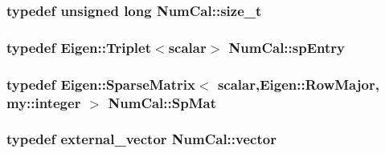 \hypertarget{namespaceNumCal_aa3e2bbd7c48c91db220faeb896cd15a4}{
\subsubsection[{size\+\_\+t}]{\setlength{\rightskip}{0pt plus 5cm}typedef unsigned long {\bf Num\+Cal\+::size\+\_\+t}}}\label{namespaceNumCal_aa3e2bbd7c48c91db220faeb896cd15a4}
\hypertarget{namespaceNumCal_a79ecf3f91c119611dbbd9194c2511bec}{
\subsubsection[{sp\+Entry}]{\setlength{\rightskip}{0pt plus 5cm}typedef Eigen\+::\+Triplet$<${\bf scalar}$>$ {\bf Num\+Cal\+::sp\+Entry}}}\label{namespaceNumCal_a79ecf3f91c119611dbbd9194c2511bec}
\hypertarget{namespaceNumCal_a7250a9391da84db7147d9e05c8d3f137}{
\subsubsection[{Sp\+Mat}]{\setlength{\rightskip}{0pt plus 5cm}typedef Eigen\+::\+Sparse\+Matrix$<$ {\bf scalar},Eigen\+::\+Row\+Major, {\bf my\+::integer} $>$ {\bf Num\+Cal\+::\+Sp\+Mat}}}\label{namespaceNumCal_a7250a9391da84db7147d9e05c8d3f137}
\hypertarget{namespaceNumCal_a271636c96b503821b7d9017cb419928a}{
\subsubsection[{vector}]{\setlength{\rightskip}{0pt plus 5cm}typedef {\bf external\+\_\+vector} {\bf Num\+Cal\+::vector}}}\label{namespaceNumCal_a271636c96b503821b7d9017cb419928a}


